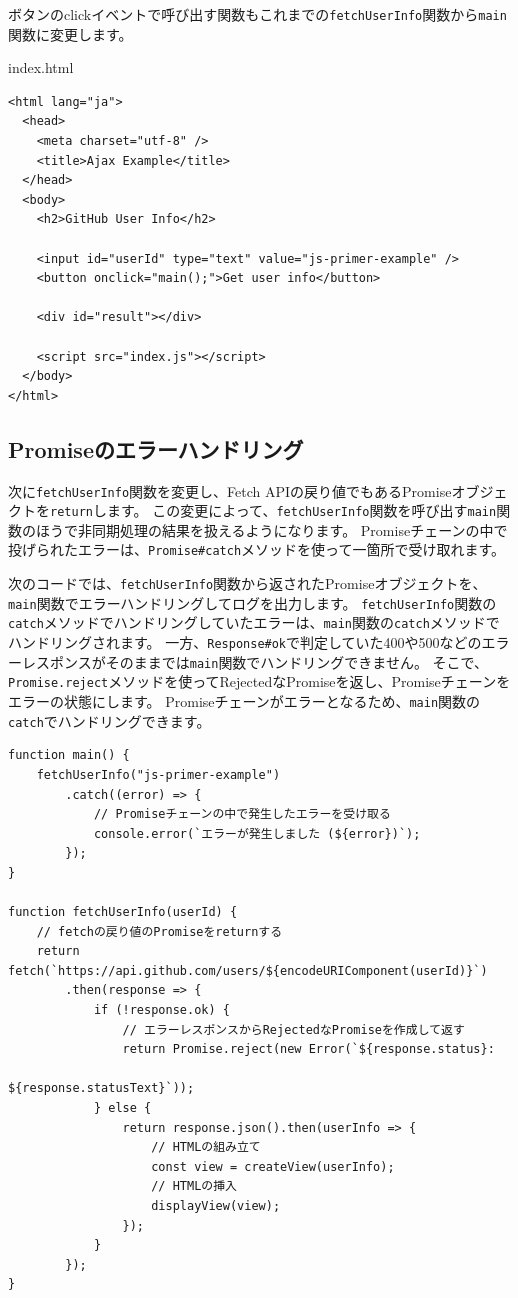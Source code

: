 ボタンのclickイベントで呼び出す関数もこれまでの\texttt{fetchUserInfo}関数から\texttt{main}関数に変更します。

\begin{listtitle}
index.html
\end{listtitle}
\begin{lstlisting}
<html lang="ja">
  <head>
    <meta charset="utf-8" />
    <title>Ajax Example</title>
  </head>
  <body>
    <h2>GitHub User Info</h2>

    <input id="userId" type="text" value="js-primer-example" />
    <button onclick="main();">Get user info</button>

    <div id="result"></div>

    <script src="index.js"></script>
  </body>
</html>
\end{lstlisting}
\listend

\hypertarget{error-handling}{%
\subsection{Promiseのエラーハンドリング}\label{error-handling}}

次に\texttt{fetchUserInfo}関数を変更し、Fetch
APIの戻り値でもあるPromiseオブジェクトを\texttt{return}します。
この変更によって、\texttt{fetchUserInfo}関数を呼び出す\texttt{main}関数のほうで非同期処理の結果を扱えるようになります。
Promiseチェーンの中で投げられたエラーは、\texttt{Promise\#catch}メソッドを使って一箇所で受け取れます。

次のコードでは、\texttt{fetchUserInfo}関数から返されたPromiseオブジェクトを、\texttt{main}関数でエラーハンドリングしてログを出力します。
\texttt{fetchUserInfo}関数の\texttt{catch}メソッドでハンドリングしていたエラーは、\texttt{main}関数の\texttt{catch}メソッドでハンドリングされます。
一方、\texttt{Response\#ok}で判定していた400や500などのエラーレスポンスがそのままでは\texttt{main}関数でハンドリングできません。
そこで、\texttt{Promise.reject}メソッドを使ってRejectedなPromiseを返し、Promiseチェーンをエラーの状態にします。
Promiseチェーンがエラーとなるため、\texttt{main}関数の\texttt{catch}でハンドリングできます。

\begin{lstlisting}
function main() {
    fetchUserInfo("js-primer-example")
        .catch((error) => {
            // Promiseチェーンの中で発生したエラーを受け取る
            console.error(`エラーが発生しました (${error})`);
        });
}

function fetchUserInfo(userId) {
    // fetchの戻り値のPromiseをreturnする
    return fetch(`https://api.github.com/users/${encodeURIComponent(userId)}`)
        .then(response => {
            if (!response.ok) {
                // エラーレスポンスからRejectedなPromiseを作成して返す
                return Promise.reject(new Error(`${response.status}: 
                                                 ${response.statusText}`));
            } else {
                return response.json().then(userInfo => {
                    // HTMLの組み立て
                    const view = createView(userInfo);
                    // HTMLの挿入
                    displayView(view);
                });
            }
        });
}
\end{lstlisting}

